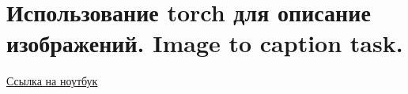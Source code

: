 \section{Использование torch для описание изображений. Image to caption task.}

\href{https://github.com/andriygav/School/blob/master/2018/AD/Lecture/Lecture17.ipynb}{Ссылка на ноутбук}